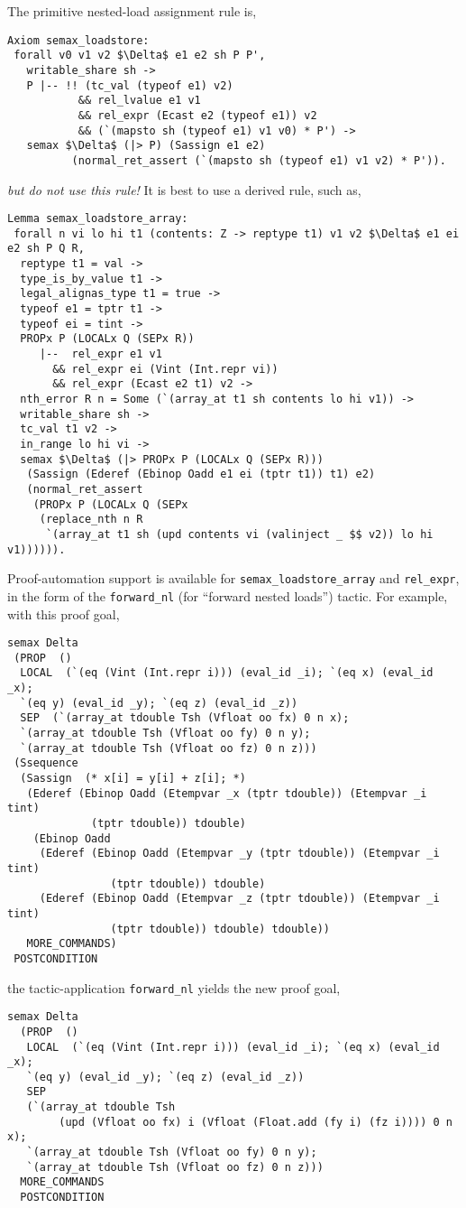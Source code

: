 \documentclass[12pt,fleqn,openany,oneside,showtrims]{memoir}
\begin{document}
\pagebreak
The primitive nested-load assignment rule is,
\begin{lstlisting}
Axiom semax_loadstore:
 forall v0 v1 v2 $\Delta$ e1 e2 sh P P', 
   writable_share sh ->
   P |-- !! (tc_val (typeof e1) v2)
           && rel_lvalue e1 v1 
           && rel_expr (Ecast e2 (typeof e1)) v2 
           && (`(mapsto sh (typeof e1) v1 v0) * P') ->
   semax $\Delta$ (|> P) (Sassign e1 e2) 
          (normal_ret_assert (`(mapsto sh (typeof e1) v1 v2) * P')).
\end{lstlisting}
\emph{but do not use this rule!}  It is best to use a derived rule,
such as,
\begin{lstlisting}
Lemma semax_loadstore_array:
 forall n vi lo hi t1 (contents: Z -> reptype t1) v1 v2 $\Delta$ e1 ei e2 sh P Q R, 
  reptype t1 = val -> 
  type_is_by_value t1 ->
  legal_alignas_type t1 = true ->
  typeof e1 = tptr t1 ->
  typeof ei = tint ->
  PROPx P (LOCALx Q (SEPx R)) 
     |--  rel_expr e1 v1 
       && rel_expr ei (Vint (Int.repr vi))
       && rel_expr (Ecast e2 t1) v2 ->
  nth_error R n = Some (`(array_at t1 sh contents lo hi v1)) ->
  writable_share sh ->
  tc_val t1 v2 ->
  in_range lo hi vi ->
  semax $\Delta$ (|> PROPx P (LOCALx Q (SEPx R))) 
   (Sassign (Ederef (Ebinop Oadd e1 ei (tptr t1)) t1) e2) 
   (normal_ret_assert 
    (PROPx P (LOCALx Q (SEPx 
     (replace_nth n R 
      `(array_at t1 sh (upd contents vi (valinject _ $$ v2)) lo hi v1)))))).
\end{lstlisting}

Proof-automation support
is available for \lstinline{semax_loadstore_array} and \lstinline{rel_expr},
in the form of the \lstinline{forward_nl} (for ``forward nested loads'')
tactic.  For example, with this proof goal,
\begin{lstlisting}
semax Delta
 (PROP  ()
  LOCAL  (`(eq (Vint (Int.repr i))) (eval_id _i); `(eq x) (eval_id _x);
  `(eq y) (eval_id _y); `(eq z) (eval_id _z))
  SEP  (`(array_at tdouble Tsh (Vfloat oo fx) 0 n x);
  `(array_at tdouble Tsh (Vfloat oo fy) 0 n y);
  `(array_at tdouble Tsh (Vfloat oo fz) 0 n z)))
 (Ssequence
  (Sassign  (* x[i] = y[i] + z[i]; *)
   (Ederef (Ebinop Oadd (Etempvar _x (tptr tdouble)) (Etempvar _i tint)
             (tptr tdouble)) tdouble)
    (Ebinop Oadd
     (Ederef (Ebinop Oadd (Etempvar _y (tptr tdouble)) (Etempvar _i tint)
                (tptr tdouble)) tdouble)
     (Ederef (Ebinop Oadd (Etempvar _z (tptr tdouble)) (Etempvar _i tint)
                (tptr tdouble)) tdouble) tdouble)) 
   MORE_COMMANDS)
 POSTCONDITION
\end{lstlisting}
the tactic-application \lstinline{forward_nl} yields the new proof goal,
\begin{lstlisting}
semax Delta
  (PROP  ()
   LOCAL  (`(eq (Vint (Int.repr i))) (eval_id _i); `(eq x) (eval_id _x);
   `(eq y) (eval_id _y); `(eq z) (eval_id _z))
   SEP 
   (`(array_at tdouble Tsh
        (upd (Vfloat oo fx) i (Vfloat (Float.add (fy i) (fz i)))) 0 n x);
   `(array_at tdouble Tsh (Vfloat oo fy) 0 n y);
   `(array_at tdouble Tsh (Vfloat oo fz) 0 n z)))
  MORE_COMMANDS
  POSTCONDITION
\end{lstlisting}
\end{document}
